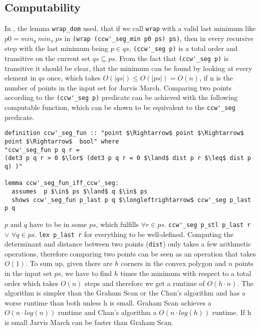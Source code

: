 \subsection{Computability}
In %
, the lemma \lstinline|wrap_dom| used, that if we 
call \lstinline|wrap| with a valid last minimum like $p0 = min_y \: min_x \: ps$ in
\lstinline|(wrap (ccw'_seg_min p0 ps) ps)|, then in every 
recursive step with the last minimum being $p \in qs$, \lstinline|(ccw'_seg p)| is a total 
order and transitive on the current set $qs \subseteq ps$. From the fact that \lstinline|(ccw'_seg p)|
is transitive it should be clear, that the minimum can be found by looking at every element 
in $qs$ once, which takes $O(|qs|) \leq O(|ps|) = O(n)$, if n is the number of points in the 
input set for Jarvis March. Comparing two points according to the \lstinline|(ccw'_seg p)|
predicate can be achieved with the following computable function, which can be shown to 
be equivalent to the \lstinline|ccw'_seg| predicate.
\begin{lstlisting}
definition ccw'_seg_fun :: "point $\Rightarrow$ point $\Rightarrow$ point $\Rightarrow$  bool" where
"ccw'_seg_fun p q r = 
(det3 p q r > 0 $\lor$ (det3 p q r = 0 $\land$ dist p r $\leq$ dist p q) )"

lemma ccw'_seg_fun_iff_ccw'_seg:
  assumes  p $\in$ ps $\land$ q $\in$ ps
  shows ccw'_seg_fun p_last p q $\longleftrightarrow$ ccw'_seg p_last p q
\end{lstlisting}
$p$ and $q$ have to be in some $ps$, which fulfills
$\forall r  \in ps.$ \lstinline|ccw'_seg p_stl p_last r| $\lor$ 
$\forall q \in ps.$ \lstinline|lex p_last r| for everything to be well-defined.
Computing the determinant and distance between two points (\lstinline|dist|) only takes
a few arithmetic operations, therefore comparing two points can be seen as an operation 
that takes $O(1)$. 
To sum up, given there are $h$ corners in the convex polygon and $n$ points in the 
input set $ps$, we have to find $h$ times the minimum with respect to a total order
which takes $O(n)$ steps and therefore we get a runtime of $O(h \cdot n)$.
The algorithm is simpler than the Graham Scan or the Chan's algorithm and has a worse
runtime than both unless h is small. Graham Scan achieves a $O(n \cdot log(n))$ runtime and 
Chan's algorithm a $O(n \cdot log(h))$ runtime. If h is small Jarvis March 
can be faster than Graham Scan.



